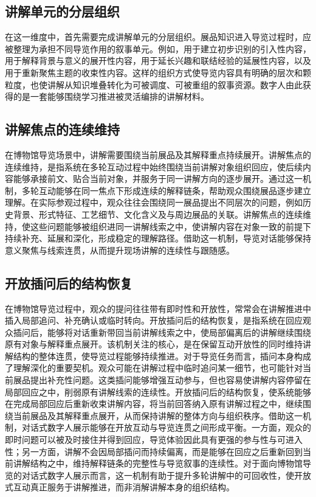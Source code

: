 \subsection{讲解单元的分层组织}
在这一维度中，首先需要完成讲解单元的分层组织。展品知识进入导览过程时，应被整理为承担不同导览作用的叙事单元。例如，用于建立初步识别的引入性内容，用于解释背景与意义的展开性内容，用于延长兴趣和联结经验的延展性内容，以及用于重新聚焦主题的收束性内容。这样的组织方式使导览内容具有明确的层次和颗粒度，也使讲解从知识堆叠转化为可被调度、可被重组的叙事资源。数字人由此获得的是一套能够围绕学习推进被灵活编排的讲解材料。

\subsection{讲解焦点的连续维持}
在博物馆导览场景中，讲解需要围绕当前展品及其解释重点持续展开。讲解焦点的连续维持，是指系统在多轮互动过程中始终围绕当前讲解对象组织回应，使后续内容能够承接前文、贴合当前对象，并服务于同一讲解方向的逐步展开。通过这一机制，多轮互动能够在同一焦点下形成连续的解释链条，帮助观众围绕展品逐步建立理解。在实际参观过程中，观众往往会围绕同一展品提出不同层次的问题，例如历史背景、形式特征、工艺细节、文化含义及与周边展品的关联。讲解焦点的连续维持，使这些问题能够被组织进同一讲解线索之中，使讲解内容在对象一致的前提下持续补充、延展和深化，形成稳定的理解路径。借助这一机制，导览对话能够保持意义聚焦与线索连贯，从而提升现场讲解的连续性与跟随感。

\subsection{开放插问后的结构恢复}
在博物馆导览过程中，观众的提问往往带有即时性和开放性，常常会在讲解推进中插入局部追问、补充确认或临时转向。开放插问后的结构恢复，是指系统在回应观众插问后，能够将对话重新带回当前讲解线索之中，使局部偏离后的讲解继续围绕原有对象与解释重点展开。该机制关注的核心，是在保留互动开放性的同时维持讲解结构的整体连贯，使导览过程能够持续推进。对于导览任务而言，插问本身构成了理解深化的重要契机。观众可能在讲解过程中临时追问某一细节，也可能针对当前展品提出补充性问题。这类插问能够增强互动参与，但也容易使讲解内容停留在局部回应之中，削弱原有讲解线索的连续性。开放插问后的结构恢复，使系统能够在完成局部回应后重新收束讲解内容，将当前回答纳入原有讲解过程之中，继续围绕当前展品及其解释重点展开，从而保持讲解的整体方向与组织秩序。借助这一机制，对话式数字人展示能够在开放互动与导览连贯之间形成平衡。一方面，观众的即时问题可以被及时接住并得到回应，导览体验因此具有更强的参与性与可进入性；另一方面，讲解不会因局部插问而持续偏离，而是能够在回应之后重新回到当前讲解结构之中，维持解释链条的完整性与导览叙事的连续性。对于面向博物馆导览的对话式数字人展示而言，这一机制有助于提升多轮讲解中的可回收性，使开放式互动真正服务于讲解推进，而非消解讲解本身的组织结构。

